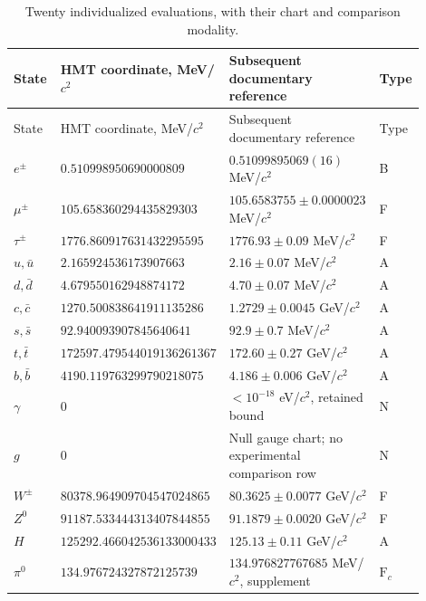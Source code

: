 \begingroup
\small
\setlength{\tabcolsep}{3pt}
\begin{longtable}{p{0.13\linewidth}p{0.32\linewidth}p{0.38\linewidth}p{0.07\linewidth}}
\caption{Twenty individualized evaluations, with their chart and comparison modality.}
\label{vi:tab:vi-evaluaciones-veinte}\\
\toprule
State & HMT coordinate, MeV/\(c^2\) & Subsequent documentary reference & Type\\
\midrule
\endfirsthead
\toprule
State & HMT coordinate, MeV/\(c^2\) & Subsequent documentary reference & Type\\
\midrule
\endhead
\bottomrule
\endfoot
\(e^\pm\) & \(0.510998950\allowbreak690000809\) & \(0.51099895069(16)\) MeV/\(c^2\) & B\\
\(\mu^\pm\) & \(105.658360294\allowbreak435829303\) & \(105.6583755\pm0.0000023\) MeV/\(c^2\) & F\\
\(\tau^\pm\) & \(1776.860917631\allowbreak432295595\) & \(1776.93\pm0.09\) MeV/\(c^2\) & F\\
\(u,\bar u\) & \(2.165924536\allowbreak173907663\) & \(2.16\pm0.07\) MeV/\(c^2\) & A\\
\(d,\bar d\) & \(4.679550162\allowbreak948874172\) & \(4.70\pm0.07\) MeV/\(c^2\) & A\\
\(c,\bar c\) & \(1270.500838641\allowbreak911135286\) & \(1.2729\pm0.0045\) GeV/\(c^2\) & A\\
\(s,\bar s\) & \(92.940093907\allowbreak845640641\) & \(92.9\pm0.7\) MeV/\(c^2\) & A\\
\(t,\bar t\) & \(172597.479544019\allowbreak136261367\) & \(172.60\pm0.27\) GeV/\(c^2\) & A\\
\(b,\bar b\) & \(4190.119763299\allowbreak790218075\) & \(4.186\pm0.006\) GeV/\(c^2\) & A\\
\(\gamma\) & \(0\) & \(<10^{-18}\) eV/\(c^2\), retained bound & N\\
\(g\) & \(0\) & Null gauge chart; no experimental comparison row & N\\
\(W^\pm\) & \(80378.964909704\allowbreak547024865\) & \(80.3625\pm0.0077\) GeV/\(c^2\) & F\\
\(Z^0\) & \(91187.533444313\allowbreak407844855\) & \(91.1879\pm0.0020\) GeV/\(c^2\) & F\\
\(H\) & \(125292.466042536\allowbreak133000433\) & \(125.13\pm0.11\) GeV/\(c^2\) & A\\
\(\pi^0\) & \(134.976724327\allowbreak872125739\) & \(134.976827767685\) MeV/\(c^2\), supplement & \(\mathrm F_c\)\\

\end{longtable}
